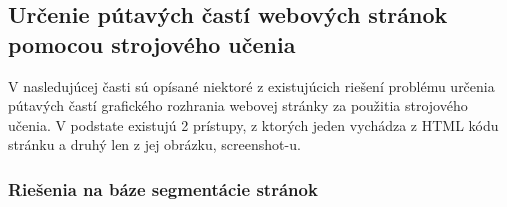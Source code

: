  
\iffalse	
\subsection{Určenie pútavých častí webových stránok pomocou strojového učenia}
\label{machine_learning}
	V nasledujúcej časti sú opísané niektoré z existujúcich riešení problému určenia pútavých častí grafického rozhrania webovej stránky za použitia strojového učenia. V podstate existujú 2 prístupy, z ktorých jeden vychádza z HTML kódu stránku a druhý len z jej obrázku, screenshot-u. 
	

\subsubsection{Riešenia na báze segmentácie stránok}

